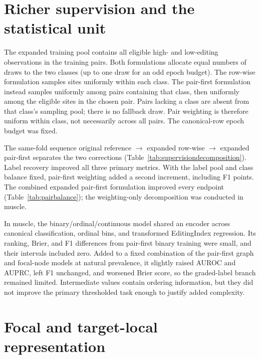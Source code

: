 \documentclass[9pt,twoside]{pnas-new}
\begin{document}
\section{Richer supervision and the statistical unit}\label{si:supervision}

The expanded training pool contains all eligible high- and low-editing observations in the training pairs. Both formulations allocate equal numbers of draws to the two classes (up to one draw for an odd epoch budget). The row-wise formulation samples sites uniformly within each class. The pair-first formulation instead samples uniformly among pairs containing that class, then uniformly among the eligible sites in the chosen pair. Pairs lacking a class are absent from that class's sampling pool; there is no fallback draw. Pair weighting is therefore uniform within class, not necessarily across all pairs. The canonical-row epoch budget was fixed.

The same-fold sequence original reference $\rightarrow$ expanded row-wise $\rightarrow$ expanded pair-first separates the two corrections (Table~\ref{tab:supervisiondecomposition}). Label recovery improved all three primary metrics. With the label pool and class balance fixed, pair-first weighting added a second increment, including \MusclePairFirstIncrementFOneMedian{} F1 points. The combined expanded pair-first formulation improved every endpoint (Table~\ref{tab:pairbalance}); the weighting-only decomposition was conducted in muscle.

In muscle, the binary/ordinal/continuous model shared an encoder across canonical classification, ordinal bins, and transformed EditingIndex regression. Its ranking, Brier, and F1 differences from pair-first binary training were small, and their intervals included zero. Added to a fixed combination of the pair-first graph and focal-node models at natural prevalence, it slightly raised AUROC and AUPRC, left F1 unchanged, and worsened Brier score, so the graded-label branch remained limited. Intermediate values contain ordering information, but they did not improve the primary thresholded task enough to justify added complexity.




\section{Focal and target-local representation}\label{si:target-local}
\end{document}
